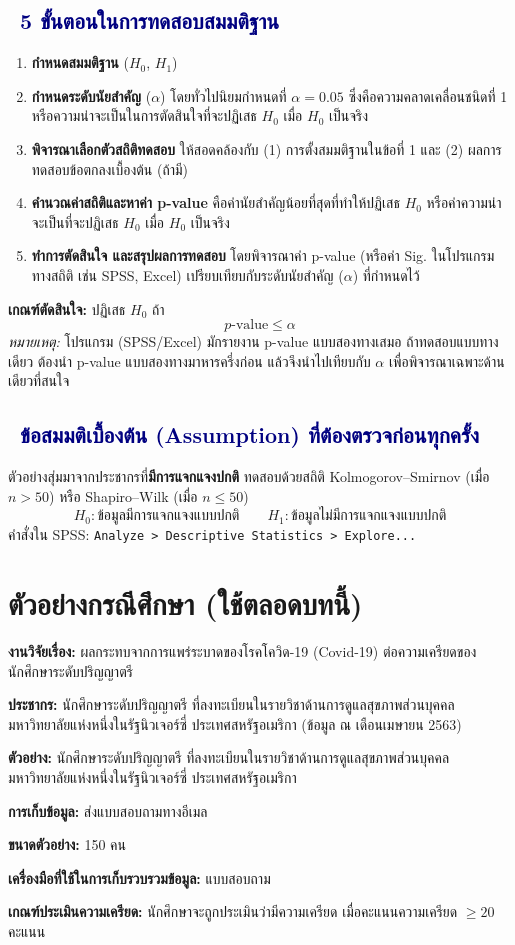 \documentclass[10pt]{extarticle}
\newcommand{\dist}[1]{\subsection*{\textcolor{navy}{\textbullet\ #1}}}
\begin{document}
\dist{5 ขั้นตอนในการทดสอบสมมติฐาน}
\begin{enumerate}
\item \textbf{กำหนดสมมติฐาน} ($H_0$, $H_1$)
\item \textbf{กำหนดระดับนัยสำคัญ} ($\alpha$) โดยทั่วไปนิยมกำหนดที่ $\alpha=0.05$ ซึ่งคือความคลาดเคลื่อนชนิดที่ 1 หรือความน่าจะเป็นในการตัดสินใจที่จะปฏิเสธ $H_0$ เมื่อ $H_0$ เป็นจริง
\item \textbf{พิจารณาเลือกตัวสถิติทดสอบ} ให้สอดคล้องกับ (1) การตั้งสมมติฐานในข้อที่ 1 และ (2) ผลการทดสอบข้อตกลงเบื้องต้น (ถ้ามี)
\item \textbf{คำนวณค่าสถิติและหาค่า p-value} คือค่านัยสำคัญน้อยที่สุดที่ทำให้ปฏิเสธ $H_0$ หรือค่าความน่าจะเป็นที่จะปฏิเสธ $H_0$ เมื่อ $H_0$ เป็นจริง
\item \textbf{ทำการตัดสินใจ และสรุปผลการทดสอบ} โดยพิจารณาค่า p-value (หรือค่า Sig. ในโปรแกรมทางสถิติ เช่น SPSS, Excel) เปรียบเทียบกับระดับนัยสำคัญ ($\alpha$) ที่กำหนดไว้
\end{enumerate}

\begin{formulabox}
\textbf{เกณฑ์ตัดสินใจ:} ปฏิเสธ $H_0$ ถ้า
$$p\text{-value}\le\alpha$$
\textit{หมายเหตุ:} โปรแกรม (SPSS/Excel) มักรายงาน p-value แบบสองทางเสมอ ถ้าทดสอบแบบทางเดียว ต้องนำ p-value แบบสองทางมาหารครึ่งก่อน แล้วจึงนำไปเทียบกับ $\alpha$ เพื่อพิจารณาเฉพาะด้านเดียวที่สนใจ
\end{formulabox}

\dist{ข้อสมมติเบื้องต้น (Assumption) ที่ต้องตรวจก่อนทุกครั้ง}
ตัวอย่างสุ่มมาจากประชากรที่\textbf{มีการแจกแจงปกติ} ทดสอบด้วยสถิติ Kolmogorov--Smirnov (เมื่อ $n>50$) หรือ Shapiro--Wilk (เมื่อ $n\le50$)
$$H_0:\text{ข้อมูลมีการแจกแจงแบบปกติ}\qquad H_1:\text{ข้อมูลไม่มีการแจกแจงแบบปกติ}$$
คำสั่งใน SPSS: \texttt{Analyze > Descriptive Statistics > Explore...}

\section{ตัวอย่างกรณีศึกษา (ใช้ตลอดบทนี้)}

\begin{qbox}
\textbf{งานวิจัยเรื่อง:} ผลกระทบจากการแพร่ระบาดของโรคโควิด-19 (Covid-19) ต่อความเครียดของนักศึกษาระดับปริญญาตรี

\textbf{ประชากร:} นักศึกษาระดับปริญญาตรี ที่ลงทะเบียนในรายวิชาด้านการดูแลสุขภาพส่วนบุคคล มหาวิทยาลัยแห่งหนึ่งในรัฐนิวเจอร์ซี่ ประเทศสหรัฐอเมริกา (ข้อมูล ณ เดือนเมษายน 2563)

\textbf{ตัวอย่าง:} นักศึกษาระดับปริญญาตรี ที่ลงทะเบียนในรายวิชาด้านการดูแลสุขภาพส่วนบุคคล มหาวิทยาลัยแห่งหนึ่งในรัฐนิวเจอร์ซี่ ประเทศสหรัฐอเมริกา

\textbf{การเก็บข้อมูล:} ส่งแบบสอบถามทางอีเมล

\textbf{ขนาดตัวอย่าง:} 150 คน

\textbf{เครื่องมือที่ใช้ในการเก็บรวบรวมข้อมูล:} แบบสอบถาม

\textbf{เกณฑ์ประเมินความเครียด:} นักศึกษาจะถูกประเมินว่ามีความเครียด เมื่อคะแนนความเครียด $\ge 20$ คะแนน
\end{qbox}
\end{document}
